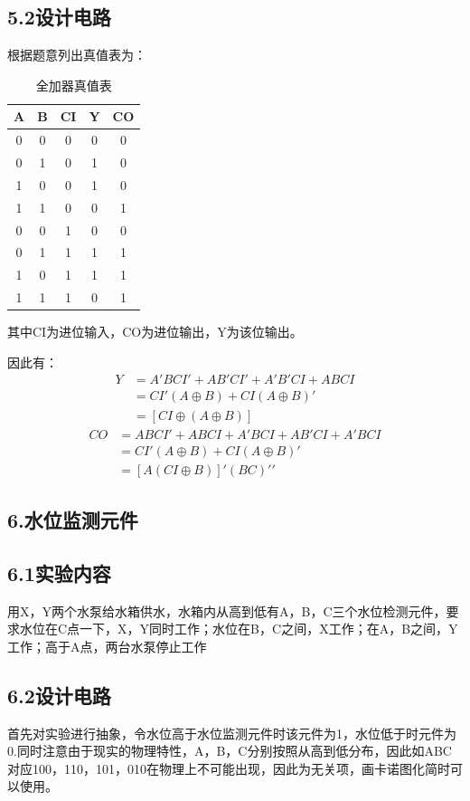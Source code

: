 \documentclass{ctexart}
\begin{document}
    \subsection*{5.2设计电路}
    根据题意列出真值表为：
    \begin{table}[!ht]
    \centering
    \caption{全加器真值表}
    \begin{tabular}{|c|c|c|c|c|}
    \hline
        A & B &  CI & Y & CO \\ \hline
        0 & 0 & 0 & 0 & 0 \\ \hline
        0 & 1 & 0 & 1 & 0 \\ \hline
        1 & 0 & 0 & 1 & 0 \\ \hline
        1 & 1 & 0 & 0 & 1 \\ \hline
        0 & 0 & 1 & 0 & 0 \\ \hline
        0 & 1 & 1 & 1 & 1 \\ \hline
        1 & 0 & 1 & 1 & 1 \\ \hline
        1 & 1 & 1 & 0 & 1 \\ \hline
    \end{tabular}
    \end{table}

    其中CI为进位输入，CO为进位输出，Y为该位输出。

    因此有：
    \begin{align*}
        Y &=A'B CI'+AB'CI'+A'B'CI+AB CI\\
          &=CI'(A\oplus B)+CI(A\oplus B)'\\
          &=[CI \oplus (A\oplus B)]
    \end{align*}
    \begin{align*}
        CO &=AB CI'+ABCI+A'BCI+AB'CI+A'B CI\\
          &=CI'(A\oplus B)+CI(A\oplus B)'\\
          &={[A(CI\oplus B)]'(BC)'}'
    \end{align*}
    
    \subsection*{6.水位监测元件}
    \subsection*{6.1实验内容}
    用X，Y两个水泵给水箱供水，水箱内从高到低有A，B，C三个水位检测元件，要求水位在C点一下，X，Y同时工作；水位在B，C之间，X工作；在A，B之间，Y工作；高于A点，两台水泵停止工作
    \subsection*{6.2设计电路}
    首先对实验进行抽象，令水位高于水位监测元件时该元件为1，水位低于时元件为0.同时注意由于现实的物理特性，A，B，C分别按照从高到低分布，因此如ABC对应100，110，101，010在物理上不可能出现，因此为无关项，画卡诺图化简时可以使用。
\end{document}
